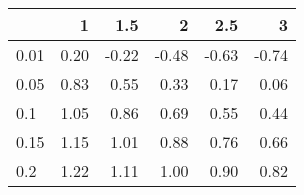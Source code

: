 
\begin{tabular}{lrrrrr}
\toprule
  & 1 & 1.5 & 2 & 2.5 & 3\\
\midrule
0.01 & 0.20 & -0.22 & -0.48 & -0.63 & -0.74\\
0.05 & 0.83 & 0.55 & 0.33 & 0.17 & 0.06\\
0.1 & 1.05 & 0.86 & 0.69 & 0.55 & 0.44\\
0.15 & 1.15 & 1.01 & 0.88 & 0.76 & 0.66\\
0.2 & 1.22 & 1.11 & 1.00 & 0.90 & 0.82\\
\bottomrule
\end{tabular}
